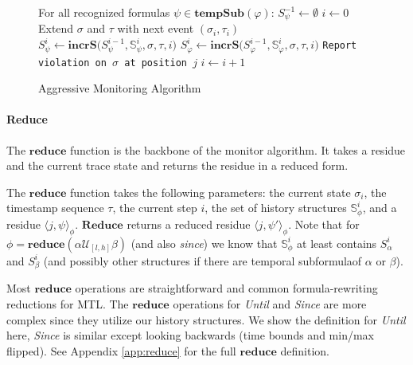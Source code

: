 \documentclass[]{llncs}
\newcommand{\rp}[2]{\ensuremath{\langle #1, #2 \rangle}}
\newcommand{\rpt}[3]{\ensuremath{\langle #1, #2 \rangle}_{#3}}
\begin{document}
\begin{figure}
\begin{algorithmic}[1]
\STATE For all recognized formulas $\psi \in \mathbf{tempSub}(\varphi)$: $S^{-1}_{\psi} \leftarrow \emptyset$
\STATE $i \leftarrow 0$
\LOOP
\STATE Extend $\sigma$ and $\tau$ with next event $(\sigma_i,\tau_i)$
	\STATE $S^i_{\psi} \leftarrow \mathbf{incrS(} S^{i-1}_{\psi}, \mathbb{S}^i_{\psi}, \sigma, \tau, i)$
\ENDFOR
\STATE $S^i_{\varphi} \leftarrow \mathbf{incrS(} S^{i-1}_{\varphi}, \mathbb{S}^i_{\varphi}, \sigma, \tau, i)$
\FOR{all $\rp{j}{\bot} \in S^i_{\varphi}$}
\STATE \texttt{Report violation on $\sigma$ at position $j$}
\ENDFOR
\STATE $i \leftarrow i + 1$
\ENDLOOP
\end{algorithmic}
\caption{Aggressive Monitoring Algorithm}\label{fig:ag_algorithm}
\end{figure}



\paragraph{Reduce}
The $\mathbf{reduce}$ function is the backbone of the monitor algorithm. It takes a residue and the current trace state and returns the residue in a reduced form.

The $\mathbf{reduce}$ function takes the following parameters: the current state $\sigma_i$, the timestamp sequence $\tau$, the current step $i$, the set of history structures $\mathbb{S}^i_{\phi}$, and a residue $\rpt{j}{\psi}{\phi}$. $\mathbf{Reduce}$ returns a reduced residue $\rpt{j}{\psi'}{\phi}$. Note that for $\phi = \mathbf{reduce}(\alpha \mathcal{U}_{[l,h]} \beta)$ (and also \emph{since}) we know that $\mathbb{S}^i_\phi$ at least contains $S^i_\alpha$ and $S^i_\beta$ (and possibly other structures if there are temporal subformulaof $\alpha$ or $\beta$).

Most $\mathbf{reduce}$ operations are straightforward and common formula-rewriting reductions for MTL. The $\mathbf{reduce}$ operations for \emph{Until} and \emph{Since} are more complex since they utilize our history structures. We show the definition for \emph{Until} here, \emph{Since} is similar except looking backwards (time bounds and min/max flipped). See Appendix \ref{app:reduce} for the full $\mathbf{reduce}$ definition.
\end{document}
